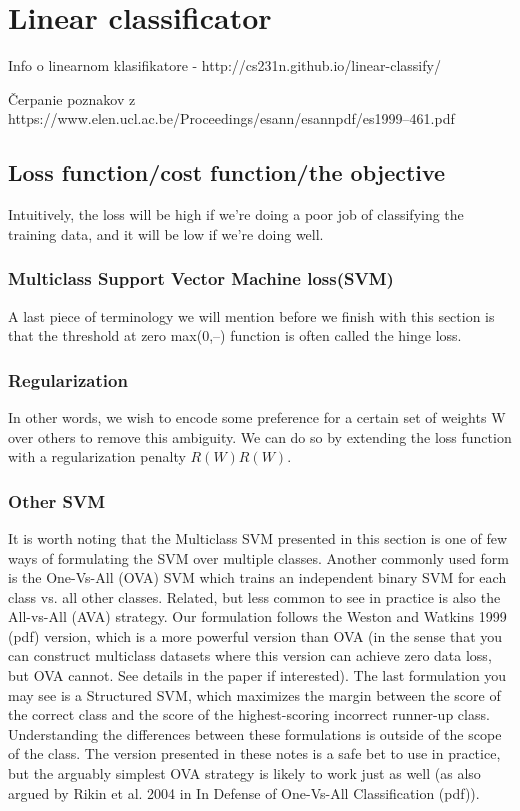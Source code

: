\documentclass[10pt,a4paper]{article}
\begin{document}
\section{Linear classificator}
Info o linearnom klasifikatore - http://cs231n.github.io/linear-classify/

Čerpanie poznakov z https://www.elen.ucl.ac.be/Proceedings/esann/esannpdf/es1999--461.pdf

\subsection{Loss function/cost function/the objective}
Intuitively, the loss will be high if we’re doing a poor job of classifying the training data, and it will be low if we’re doing well.

\subsubsection{Multiclass Support Vector Machine loss(SVM)}
A last piece of terminology we will mention before we finish with this section is that the threshold at zero max(0,--) function is often called the hinge loss.

\subsubsection{Regularization}
In other words, we wish to encode some preference for a certain set of weights W over others to remove this ambiguity. We can do so by extending the loss function with a regularization penalty $R(W)R(W)$.

\subsubsection{Other SVM}
It is worth noting that the Multiclass SVM presented in this section is one of few ways of formulating the SVM over multiple classes.
Another commonly used form is the One-Vs-All (OVA) SVM which trains an independent binary SVM for each class vs. all other classes.
Related, but less common to see in practice is also the All-vs-All (AVA) strategy.
Our formulation follows the Weston and Watkins 1999 (pdf) version, which is a more powerful version than OVA (in the sense that you can construct multiclass datasets where this version can achieve zero data loss, but OVA cannot.
See details in the paper if interested).
The last formulation you may see is a Structured SVM, which maximizes the margin between the score of the correct class and the score of the highest-scoring incorrect runner-up class.
Understanding the differences between these formulations is outside of the scope of the class.
The version presented in these notes is a safe bet to use in practice, but the arguably simplest OVA strategy is likely to work just as well (as also argued by Rikin et al. 2004 in In Defense of One-Vs-All Classification (pdf)).
\end{document}
